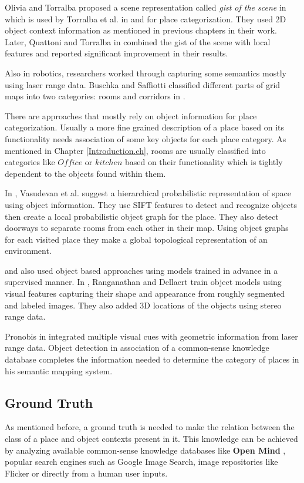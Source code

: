  Olivia and Torralba proposed a scene representation called {\it gist of the scene} in \cite{oliva2006building} which is 
 used by Torralba et al. in \cite{TorralbaContextualPriming} and \cite{TrollbaContexBased} for place categorization.
 They used 2D object context information as mentioned in previous chapters in their work.
 Later, Quattoni and Torralba in \cite{quattoni2009recognizing} combined the gist of the scene with local features and 
 reported significant improvement in their results.
 
 Also in robotics, researchers worked through capturing some semantics mostly using laser range data.
 Buschka and Saffiotti classified different parts of grid maps into two categories: rooms and corridors in \cite{buschka2002virtual}. 
 
 There are approaches that mostly rely on object information for place categorization.
 Usually a more fine grained description of a place based on its functionality needs association of some key objects 
 for each place category.
 As mentioned in Chapter \ref{Introduction.ch}, rooms are usually classified into categories like $Office$ or 
 $kitchen$ based on their functionality which is tightly dependent to the objects found within them.
 
In \cite{Vasudevan2007359}, Vasudevan et al. suggest a hierarchical probabilistic representation of space using object
information. 
They use SIFT features to detect and recognize objects then create a local probabilistic object graph for the place. 
They also detect doorways to separate rooms from each other in their map. 
Using object graphs for each visited place they make a global topological representation of an environment.

\cite{ranganathan2007semantic} and \cite{P.Viswanathan} also used object based approaches using models trained in 
advance in a supervised manner. 
In \cite{ranganathan2007semantic}, Ranganathan and Dellaert train object models using visual features capturing their 
shape and appearance from roughly segmented and labeled images. 
They also added 3D locations of the objects using stereo range data.
 
Pronobis in \cite{pronobis2011phd} integrated multiple visual cues with geometric information from laser range data. 
Object detection in association of a common-sense knowledge database completes the information needed to determine the category of places in his semantic mapping system.
 
\subsection{Ground Truth}
\label{GroundTruth.sec}
As mentioned before, a ground truth is needed to make the relation between the class of a place and object contexts 
present in it.
This knowledge can be achieved by analyzing available common-sense knowledge databases like {\bf Open Mind} \cite{OpenMind}, 
popular search engines such as Google Image Search, image repositories like Flicker or directly from a human user 
inputs. 

